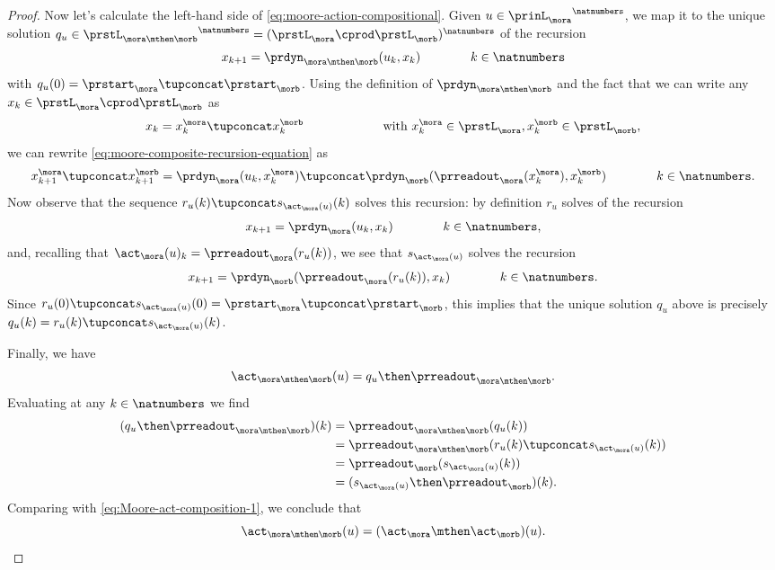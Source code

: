 \begin{proof}
Now let's calculate the left-hand side of \cref{eq:moore-action-compositional}. Given $u \in {\prinL_{\mora}}^\natnumbers$, we map it to the unique solution $q_u \in {\prstL_{\mora \mthen \morb}}^\natnumbers = ({\prstL_{\mora} \cprod \prstL_{\morb}})^\natnumbers$ of the recursion 
\begin{equation}
\label{eq:moore-composite-recursion-equation}
        x_{k+1} = \prdyn_{\mora \mthen \morb}(u_k, x_k)  \qquad \qquad k \in \natnumbers
\end{equation}
with $q_u(0) = \prstart_{\mora} \tupconcat \prstart_{\morb}$. Using the definition of $\prdyn_{\mora \mthen \morb}$ and the fact that we can write any $x_k \in \prstL_{\mora} \cprod \prstL_{\morb}$ as 
$$x_k = x^\mora_k \tupconcat x^\morb_k \qquad \qquad \qquad \text{ with } x^\mora_k \in \prstL_{\mora}, x^\morb_k \in \prstL_{\morb},$$ 
we can rewrite \cref{eq:moore-composite-recursion-equation} as
\begin{equation}
        x^\mora_{k+1} \tupconcat x^\morb_{k+1} = \prdyn_{\mora}(u_k, x^\mora_k) \tupconcat \prdyn_{\morb}(\prreadout_\mora(x^\mora_k), x^\morb_k)  \qquad \qquad k \in \natnumbers.
\end{equation}
Now observe that the sequence $r_u(k) \tupconcat s_{\act_\mora(u)}(k)$ solves this recursion: by definition $r_u$ solves of the recursion
\begin{equation}
        x_{k+1} = \prdyn_\mora(u_k, x_k)  \qquad \qquad k \in \natnumbers,
\end{equation}
and, recalling that $\act_\mora(u)_k = \prreadout_\mora(r_u(k))$, we see that $s_{\act_\mora(u)}$ solves the recursion  
\begin{equation}
        x_{k+1} = \prdyn_\morb(\prreadout_\mora(r_u(k)), x_k)  \qquad \qquad k \in \natnumbers.
\end{equation}
Since $r_u(0) \tupconcat s_{\act_\mora(u)}(0) = \prstart_{\mora} \tupconcat \prstart_{\morb}$, this implies that the unique solution $q_u$ above is precisely $q_u(k) = r_u(k) \tupconcat s_{\act_\mora(u)}(k)$. 

Finally, we have
\begin{equation}
\act_{\mora \mthen \morb}(u) = q_u \then \prreadout_{\mora \mthen \morb}.
\end{equation}
Evaluating at any $k \in \natnumbers$ we find 
\begin{align}
(q_u \then \prreadout_{\mora \mthen \morb})(k) &= \prreadout_{\mora \mthen \morb}(q_u(k)) \\
& = \prreadout_{\mora \mthen \morb}(r_u(k) \tupconcat s_{\act_\mora(u)}(k)) \\
&= \prreadout_{\morb}(s_{\act_\mora(u)}(k)) \\
& = (s_{\act_\mora(u)} \then \prreadout_{\morb})(k).
\end{align}
Comparing with \cref{eq:Moore-act-composition-1}, we conclude that 
\begin{equation}
\act_{\mora \mthen \morb}(u) = (\act_\mora \mthen \act_\morb)(u). 
\end{equation}
\end{proof}


